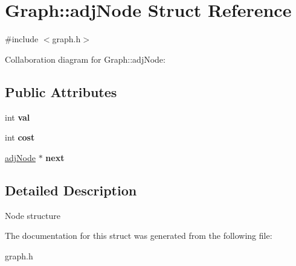 \hypertarget{structGraph_1_1adjNode}{}\section{Graph\+:\+:adj\+Node Struct Reference}
\label{structGraph_1_1adjNode}


{\ttfamily \#include $<$graph.\+h$>$}



Collaboration diagram for Graph\+:\+:adj\+Node\+:
\subsection*{Public Attributes}
\begin{DoxyCompactItemize}
\item 
\mbox{\label{structGraph_1_1adjNode_a42dbb2e694495144d3958be13e9e95d3}} 
int {\bfseries val}
\item 
\mbox{\label{structGraph_1_1adjNode_a40b23eab05a88eb7517be3e24dc2eec4}} 
int {\bfseries cost}
\item 
\mbox{\label{structGraph_1_1adjNode_aa69c4ceb02dba8d812dc1c60df178c41}} 
\hyperlink{structGraph_1_1adjNode}{adj\+Node} $\ast$ {\bfseries next}
\end{DoxyCompactItemize}


\subsection{Detailed Description}
Node structure 

The documentation for this struct was generated from the following file\+:\begin{DoxyCompactItemize}
\item 
graph.\+h\end{DoxyCompactItemize}
